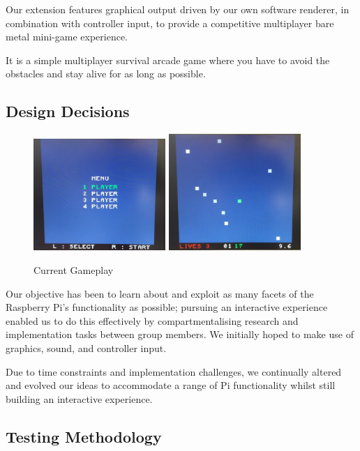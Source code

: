 \documentclass[11pt]{article}
\begin{document}
Our extension features graphical output driven by our own software renderer, in
combination with controller input, to provide a competitive multiplayer bare
metal mini-game experience.

It is a simple multiplayer survival arcade game where you have to avoid the
obstacles and stay alive for as long as possible.

\subsection{Design Decisions}

\begin{figure}
  \caption{Current Gameplay}\label{wrap-fig:1}
  \includegraphics[width=5cm]{menu}
  \includegraphics[width=5cm]{screen}
\end{figure}

Our objective has been to learn about and exploit as many facets of the
Raspberry Pi's functionality as possible; pursuing an interactive experience
enabled us to do this effectively by compartmentalising research and
implementation tasks between group members. We initially hoped to make use of
graphics, sound, and controller input.

Due to time constraints and implementation challenges, we continually altered
and evolved our ideas to accommodate a range of Pi functionality whilst still
building an interactive experience.

\subsection{Testing Methodology}
\end{document}
